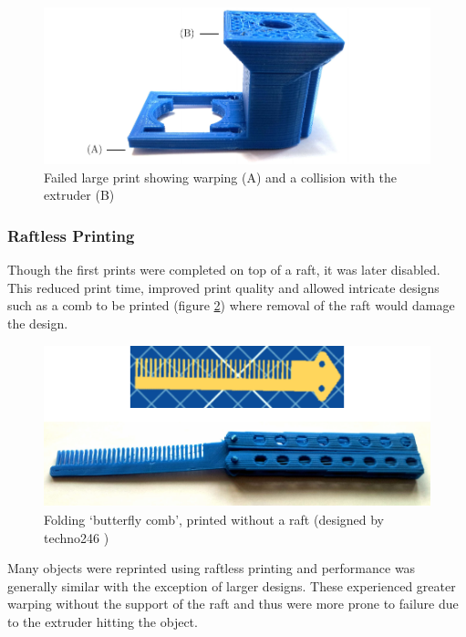				\begin{figure}
					\includegraphics[width=1\textwidth]{diagrams/failedPrint.pdf}
					\caption{Failed large print showing warping (A) and a collision with
					         the extruder (B)}
					\label{fig:failedPrint}
				\end{figure}
				
			
			\subsubsection{Raftless Printing}
				
				Though the first prints were completed on top of a raft, it was later
				disabled. This reduced print time, improved print quality and allowed
				intricate designs such as a comb to be printed (figure \ref{fig:comb})
				where removal of the raft would damage the design.
				
				\begin{figure}
					\includegraphics[width=1\textwidth]{diagrams/comb.pdf}
					\caption{Folding `butterfly comb', printed without a raft (designed by
					         techno246 \cite{butterflycomb})}
					\label{fig:comb}
				\end{figure}
				
				Many objects were reprinted using raftless printing and performance was
				generally similar with the exception of larger designs. These
				experienced greater warping without the support of the raft and thus
				were more prone to failure due to the extruder hitting the object.
				
